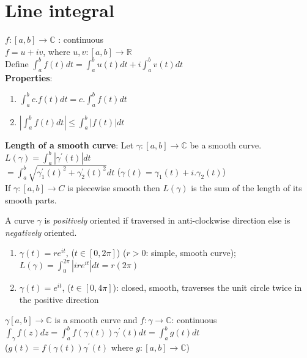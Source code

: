 \section{\textbf{Line integral}} 
$f:[a,b]\rightarrow \mathds{C}$ : continuous\\
$f=u+iv$, where $u,v:[a,b]\rightarrow \mathds{R}$\\
Define $\int_{a}^{b}f(t) dt= \int_{a}^{b}u(t) dt+ i \int_{a}^{b} v(t) dt$\\
\textbf{Properties}:
\begin{enumerate}
    \item $\int_{a}^{b} c.f(t) dt= c.\int_{a}^{b}f(t) dt$
    \item $| \int_{a}^{b}f(t) dt |\leq \int_{a}^{b}|f(t)| dt$
\end{enumerate}
\textbf{Length of a smooth curve}: Let $\gamma:[a,b]\rightarrow \mathds{C}$ be a smooth curve. \\
$L(\gamma)= \int_{a}^{b} |\gamma^{'}(t)| dt$\\
$=\int_{a}^{b} \sqrt{\gamma_1^{'}(t)^2+\gamma_2^{'}(t)^2}  dt$     \: ($\gamma(t)=\gamma_1(t)+i.\gamma_2(t)$)\\
If $\gamma:[a,b]\rightarrow C$ is piecewise smooth then $L(\gamma)$ is the sum of the length of its smooth parts.
\begin{defn}
A curve $\gamma$ is \emph{positively} oriented if traversed in anti-clockwise direction else is \emph{negatively} oriented.
\end{defn}
\begin{ex}
\begin{enumerate}
    \item $\gamma(t)=re^{it}$, ($t\in [0,2\pi]$) ($r>0$: simple, smooth curve); 
    $L(\gamma)=\int_{0}^{2\pi} |ire^{it}| dt= r(2\pi)$
    \item $\gamma(t)=e^{it}$, ($t \in [0,4\pi]$): closed, smooth, traverses the unit circle twice in the positive direction
\end{enumerate}
\end{ex}
\begin{defn}
$\gamma[a,b]\rightarrow \mathds{C}$ is a smooth curve and $f:\gamma \rightarrow \mathds{C}$: continuous \\
$\int_{\gamma}^{} f(z) dz= \int_{a}^{b} f(\gamma(t)) \gamma^{'}(t) dt=\int_{a}^{b}g(t) dt$ \\
($g(t)=f(\gamma(t)) \gamma^{'}(t)$ where $g:[a,b]\rightarrow \mathds{C}$)
\end{defn}

